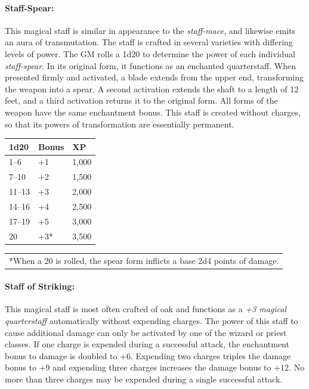 \begin{multicols}{2}
\paragraph{Staff-Spear:} This magical staff is similar in appearance to the \textit{staff-mace}, and likewise emits an aura of transmutation.  The staff is crafted in several varieties with differing levels of power.  The GM rolls a 1d20 to determine the power of each individual \textit{staff-spear}.  In its original form, it functions as an enchanted quarterstaff.  When presented firmly and activated, a blade extends from the upper end, transforming the weapon into a spear.  A second activation extends the shaft to a length of 12 feet, and a third activation returns it to the original form.  All forms of the weapon have the same enchantment bonus.  This staff is created without charges, so that its powers of transformation are essentially permanent.

\noindent
\begin{tabular}{|p{}|p{}|p{}|}
\hline
1d20	& Bonus	& XP \\
\hline\hline
\rowcolor[gray]{.9}1--6	& +1	& 1,000 \\
7--10	& +2	& 1,500 \\
\rowcolor[gray]{.9}11--13	& +3	& 2,000 \\
14--16	& +4	& 2,500 \\
\rowcolor[gray]{.9}17--19	& +5	& 3,000 \\
20	& +3*	& 3,500 \\
\hline
\end{tabular}
\noindent\begin{tabular}{p{}}
*When a 20 is rolled, the spear form inflicts a base 2d4 points of damage. \\
\end{tabular}\vspace{.5em}

\paragraph{Staff of Striking:} This magical staff is most often crafted of oak and functions as a \textit{+3 magical quarterstaff} automatically without expending charges.  The power of this staff to cause additional damage can only be activated by one of the wizard or priest classes.  If one charge is expended during a successful attack, the enchantment bonus to damage is doubled to +6.  Expending two charges triples the damage bonus to +9 and expending three charges increases the damage bonus to +12.  No more than three charges may be expended during a single successful attack.


\end{multicols}
